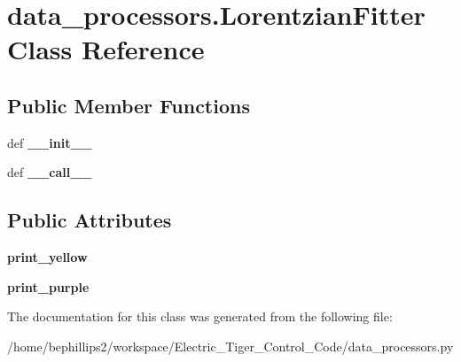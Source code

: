 \hypertarget{classdata__processors_1_1_lorentzian_fitter}{\section{data\-\_\-processors.\-Lorentzian\-Fitter Class Reference}
\label{classdata__processors_1_1_lorentzian_fitter}
}
\subsection*{Public Member Functions}
\begin{DoxyCompactItemize}
\item 
\hypertarget{classdata__processors_1_1_lorentzian_fitter_adc0517611d45e3fc0ffbaf3d65158fa5}{def {\bfseries \-\_\-\-\_\-init\-\_\-\-\_\-}}\label{classdata__processors_1_1_lorentzian_fitter_adc0517611d45e3fc0ffbaf3d65158fa5}

\item 
\hypertarget{classdata__processors_1_1_lorentzian_fitter_a2d7bcc2fd63903cc18d301a3c08c7ce6}{def {\bfseries \-\_\-\-\_\-call\-\_\-\-\_\-}}\label{classdata__processors_1_1_lorentzian_fitter_a2d7bcc2fd63903cc18d301a3c08c7ce6}

\end{DoxyCompactItemize}
\subsection*{Public Attributes}
\begin{DoxyCompactItemize}
\item 
\hypertarget{classdata__processors_1_1_lorentzian_fitter_ada40838b7c966657253b01b3c9520f59}{{\bfseries print\-\_\-yellow}}\label{classdata__processors_1_1_lorentzian_fitter_ada40838b7c966657253b01b3c9520f59}

\item 
\hypertarget{classdata__processors_1_1_lorentzian_fitter_a8af51db0e5453f33a165bf15ae19e0b9}{{\bfseries print\-\_\-purple}}\label{classdata__processors_1_1_lorentzian_fitter_a8af51db0e5453f33a165bf15ae19e0b9}

\end{DoxyCompactItemize}


The documentation for this class was generated from the following file\-:\begin{DoxyCompactItemize}
\item 
/home/bephillips2/workspace/\-Electric\-\_\-\-Tiger\-\_\-\-Control\-\_\-\-Code/data\-\_\-processors.\-py\end{DoxyCompactItemize}
